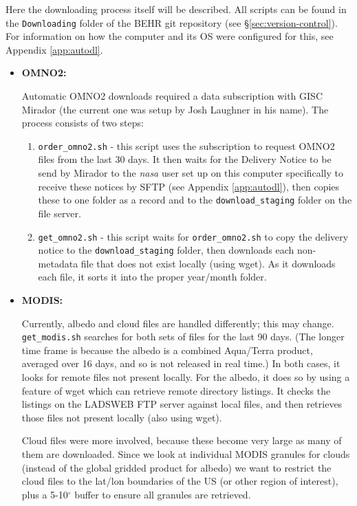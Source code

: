 \documentclass[12pt]{article}
\begin{document}
		Here the downloading process itself will be described. All scripts can be found in the \texttt{Downloading} folder of the BEHR git repository (see \S\ref{sec:version-control}).  For information on how the computer and its OS were configured for this, see Appendix \ref{app:autodl}.
		
		\begin{itemize}
			\item \textbf{OMNO2:}
			
			Automatic OMNO2 downloads required a data subscription with GISC Mirador (the current one was setup by Josh Laughner in his name). The process consists of two steps:
			\begin{enumerate} [noitemsep]
				\item \texttt{order\_omno2.sh} - this script uses the subscription to request OMNO2 files from the last 30 days. It then waits for the Delivery Notice to be send by Mirador to the \emph{nasa} user set up on this computer specifically to receive these notices by SFTP (see Appendix \ref{app:autodl}), then copies these to one folder as a record and to the \texttt{download\_staging} folder on the file server.
				
				\item \texttt{get\_omno2.sh} - this script waits for \texttt{order\_omno2.sh} to copy the delivery notice to the \texttt{download\_staging} folder, then downloads each non-metadata file that does not exist locally (using wget). As it downloads each file, it sorts it into the proper year/month folder.
			\end{enumerate}
			
			\item \textbf{MODIS:}
			
			Currently, albedo and cloud files are handled differently; this may change. \texttt{get\_modis.sh} searches for both sets of files for the last 90 days. (The longer time frame is because the albedo is a combined Aqua/Terra product, averaged over 16 days, and so is not released in real time.) In both cases, it looks for remote files not present locally. For the albedo, it does so by using a feature of wget which can retrieve remote directory listings. It checks the listings on the LADSWEB FTP server against local files, and then retrieves those files not present locally (also using wget).
			
			Cloud files were more involved, because these become very large as many of them are downloaded. Since we look at individual MODIS granules for clouds (instead of the global gridded product for albedo) we want to restrict the cloud files to the lat/lon boundaries of the US (or other region of interest), plus a 5-10$^\circ$ buffer to ensure all granules are retrieved.
			

\end{itemize}
\end{document}
